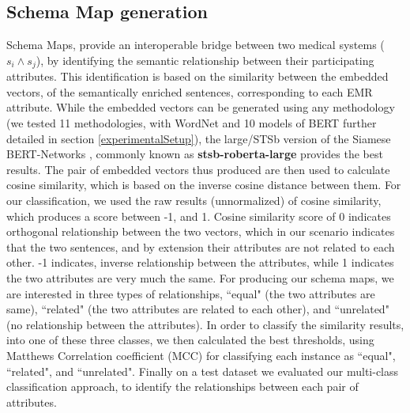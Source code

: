 \subsection*{Schema Map generation}
\label{schema_map_gen}

Schema Maps, provide an interoperable bridge between two medical systems ($s_i \wedge s_j$), by identifying the semantic relationship between their participating attributes. This identification is based on the similarity between the embedded vectors, of the semantically enriched sentences, corresponding to each EMR attribute. While the embedded vectors can be generated using any methodology (we tested 11 methodologies, with WordNet and 10 models of BERT further detailed in section \ref{experimentalSetup}), the large/STSb version of the Siamese BERT-Networks \cite{reimers-2019-sentence-bert}, commonly known as \textbf{stsb-roberta-large} provides the best results. The pair of embedded vectors thus produced are then used to calculate cosine similarity, which is based on the inverse cosine distance between them. For our classification, we used the raw results (unnormalized) of cosine similarity, which produces a score between -1, and 1. Cosine similarity score of 0 indicates orthogonal relationship between the two vectors, which in our scenario indicates that the two sentences, and by extension their attributes are not related to each other. -1 indicates, inverse relationship between the attributes, while 1 indicates the two attributes are very much the same.
For producing our schema maps, we are interested in three types of relationships, ``equal" (the two attributes are same), ``related" (the two attributes are related to each other), and ``unrelated" (no relationship between the attributes). In order to classify the similarity results, into one of these three classes, we then calculated the best thresholds, using Matthews Correlation coefficient (MCC) \cite{chicco2020advantages} for classifying each instance as ``equal", ``related", and ``unrelated". Finally on a test dataset we evaluated our multi-class classification approach, to identify the relationships between each pair of attributes.
